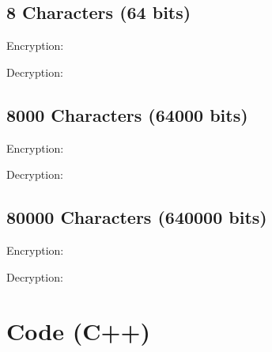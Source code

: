 \documentclass[11pt]{article}
\begin{document}
\setcounter{secnumdepth}{0}
\subsection{8 Characters (64 bits)}
Encryption:

Decryption:

\subsection{8000 Characters (64000 bits)}
Encryption:

Decryption:

\subsection{80000 Characters (640000 bits)}
Encryption:

Decryption:


\setcounter{secnumdepth}{1}
\section{Code (C++)}
\end{document}
